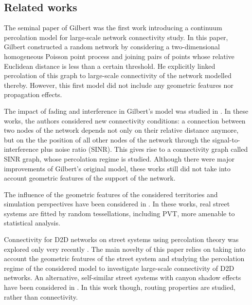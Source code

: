 \documentclass[conference]{IEEEtran}
\begin{document}
\subsection{Related works}
\label{ss.RelatedWorks}
The seminal paper of Gilbert \cite{gilbert1961random} was the first work introducing a continuum percolation
model for large-scale network connectivity study. In this paper, Gilbert constructed a random network by considering a two-dimensional homogeneous Poisson point process and joining pairs of points whose relative Euclidean distance is less than a certain threshold. He explicitly linked percolation of this graph to large-scale connectivity of the network modelled thereby. However, this first model did not include any geometric features nor propagation effects.

The impact of fading and
interference in Gilbert's model was studied in \cite{dousse2005impact,dousse2006percolation}. In these works, the authors considered new connectivity conditions: a connection between two nodes of the network depends not only on their relative distance anymore, but on the the position of all other nodes of the network through the signal-to-interference plus noise ratio (SINR). This gives rise to a connectivity graph called SINR graph, whose percolation regime is studied. Although there were major improvements of Gilbert's original model, these works still did not take into account geometric features of the support of the network.

The influence of the geometric features of the considered territories and simulation perspectives have been considered in \cite{gloaguen2006fitting, gloaguen2009parametric}. In these works, real street systems are fitted by random tessellations, including PVT, more amenable to statistical analysis.

Connectivity for D2D networks on street systems using percolation
theory was explored only very recently \cite{cali2018percolation}. The main novelty of this paper relies on taking into account the geometric features of the street system and studying the percolation regime of the considered model to investigate large-scale connectivity of D2D networks.
An alternative, self-similar  street systems with canyon shadow  effects have been considered in \cite{jacquet2017selfIEEE, jacquet2017selfSpringer,jacquet2017information}. In this work though, routing properties are studied, rather than connectivity.
\end{document}
